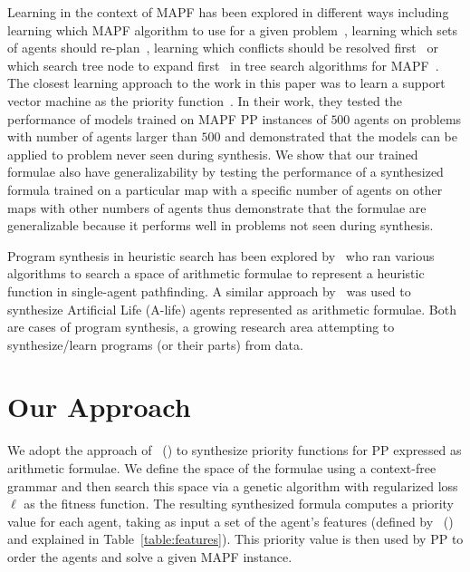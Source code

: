 \documentclass[letterpaper]{article}
\newcommand{\citea}[1]{\citeauthor{#1}~(\citeyear{#1})}
\begin{document}
Learning in the context of MAPF has been explored in different ways including learning which MAPF algorithm to use for a given problem~\citep{sigurdson2019automatic,ren2021mapfast,alkazzi2022mapfaster,kaduri2020algorithm}, learning which sets of agents should re-plan~\citep{huang2022anytime}, learning which conflicts should be resolved first~\citep{huang2021learning2} or which search tree node to expand first~\citep{huang2021learning} in tree search algorithms for MAPF~\citep{sharon2015conflict,barer2014suboptimal}. The closest learning approach to the work in this paper was to learn a support vector machine as the priority function~\cite{zhang2022learning}. In their work, they tested the performance of models trained on MAPF PP instances of $ 500 $ agents on problems with number of agents larger than $ 500 $ and demonstrated that the models can be applied to problem never seen during synthesis. We show that our trained formulae also have generalizability by testing the performance of a synthesized formula trained on a particular map with a specific number of agents on other maps with other numbers of agents thus demonstrate that the formulae are generalizable because it performs well in problems not seen during synthesis.

Program synthesis in heuristic search has been explored by~\citet{cog2020,bulitko2021fast,sergio2021,bulitko2022portability} who ran various algorithms to search a space of arithmetic formulae to represent a heuristic function in single-agent pathfinding. A similar approach by~\citet{acs2020} was used to synthesize Artificial Life (A-life) agents represented as arithmetic formulae. Both are cases of program synthesis, a growing research area attempting to synthesize/learn programs (or their parts) from data.

\section{Our Approach}
\label{ourApproach}

We adopt the approach of \citea{bulitko2022portability} to synthesize priority functions for PP expressed as arithmetic formulae. We define the space of the formulae using a context-free grammar and then search this space via a genetic algorithm with regularized loss $\ell$ as the fitness function.
The resulting synthesized formula computes a priority value for each agent, taking as input a set of the agent's features (defined by \citea{zhang2022learning} and explained in Table~\ref{table:features}).
This priority value is then used by PP to order the agents and solve a given MAPF instance.
\end{document}
